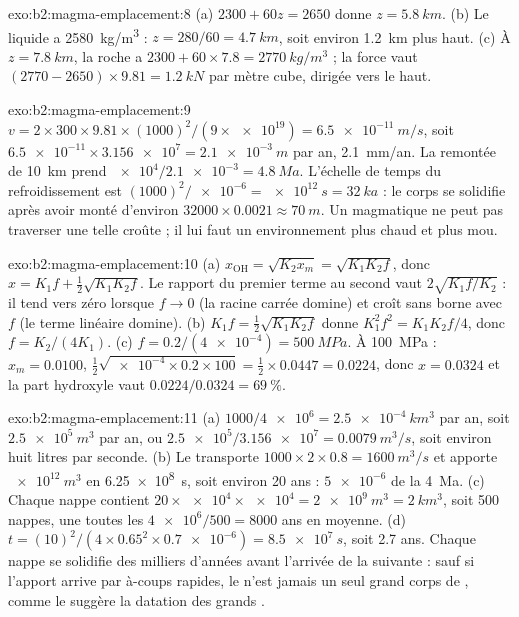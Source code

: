 \begin{solution}{exo:b2:magma-emplacement:8}
(a) $2300 + 60z = 2650$ donne $z = \qty{5.8}{km}$. (b) Le liquide a
\qty{2580}{kg/m^3} : $z = 280/60 = \qty{4.7}{km}$, soit environ \qty{1.2}{km} plus haut. (c)
À $z = \qty{7.8}{km}$, la roche a $2300 + 60\times7.8 = \qty{2770}{kg/m^3}$ ; la
force vaut $(2770 - 2650)\times9.81 = \qty{1.2}{kN}$ par mètre cube, dirigée vers le haut.
\end{solution}

\begin{solution}{exo:b2:magma-emplacement:9}
$v = 2\times300\times9.81\times(1000)^2/(9\times\num{e19}) = \qty{6.5e-11}{m/s}$, soit
$\num{6.5e-11}\times\num{3.156e7} = \qty{2.1e-3}{m}$ par an, \qty{2.1}{mm/an}. La remontée de
\qty{10}{km} prend $\num{e4}/\num{2.1e-3} = \qty{4.8}{Ma}$. L'échelle de temps du refroidissement
est $(1000)^2/\num{e-6} = \qty{e12}{s} = \qty{32}{ka}$ : le corps se solidifie après
avoir monté d'environ $32000\times0.0021 \approx \qty{70}{m}$. Un  magmatique ne peut pas traverser
une telle croûte ; il lui faut un environnement plus chaud et plus mou.
\end{solution}

\begin{solution}{exo:b2:magma-emplacement:10}
(a) $x_{\mathrm{OH}} = \sqrt{K_2x_m} = \sqrt{K_1K_2f}$, donc $x = K_1f + \frac12\sqrt{K_1K_2f}$.
Le rapport du premier terme au second vaut $2\sqrt{K_1f/K_2}$ : il tend vers zéro
lorsque $f \to 0$ (la racine carrée domine) et croît sans borne avec $f$ (le
terme linéaire domine). (b) $K_1 f = \frac12\sqrt{K_1K_2 f}$ donne $K_1^2f^2 =
K_1K_2f/4$, donc $f = K_2/(4K_1)$. (c) $f = 0.2/(\num{4e-4}) = \qty{500}{MPa}$. À
\qty{100}{MPa} : $x_m = 0.0100$, $\frac12\sqrt{\num{e-4}\times0.2\times100} =
\frac12\times0.0447 = 0.0224$, donc $x = 0.0324$ et la part hydroxyle vaut
$0.0224/0.0324 = \qty{69}{\percent}$.
\end{solution}

\begin{solution}{exo:b2:magma-emplacement:11}
(a) $1000/\num{4e6} = \qty{2.5e-4}{km^3}$ par an, soit $\qty{2.5e5}{m^3}$ par an,
ou $\num{2.5e5}/\num{3.156e7} = \qty{0.0079}{m^3/s}$, soit environ huit litres par seconde.
(b) Le  transporte $1000\times2\times0.8 = \qty{1600}{m^3/s}$ et apporte
$\qty{e12}{m^3}$ en \qty{6.25e8}{s}, soit environ 20 ans : $\num{5e-6}$ de la
\qty{4}{Ma}. (c) Chaque nappe contient $20\times\num{e4}\times\num{e4} = \qty{2e9}{m^3} =
\qty{2}{km^3}$, soit 500 nappes, une toutes les $\num{4e6}/500 = 8000$ ans en moyenne.
(d) $t = (10)^2/(4\times0.65^2\times\num{0.7e-6}) = \qty{8.5e7}{s}$, soit 2.7 ans. Chaque
nappe se solidifie des milliers d'années avant l'arrivée de la suivante : sauf si l'apport
arrive par à-coups rapides, le  n'est jamais un seul grand corps de , comme le
suggère la datation des grands .
\end{solution}

